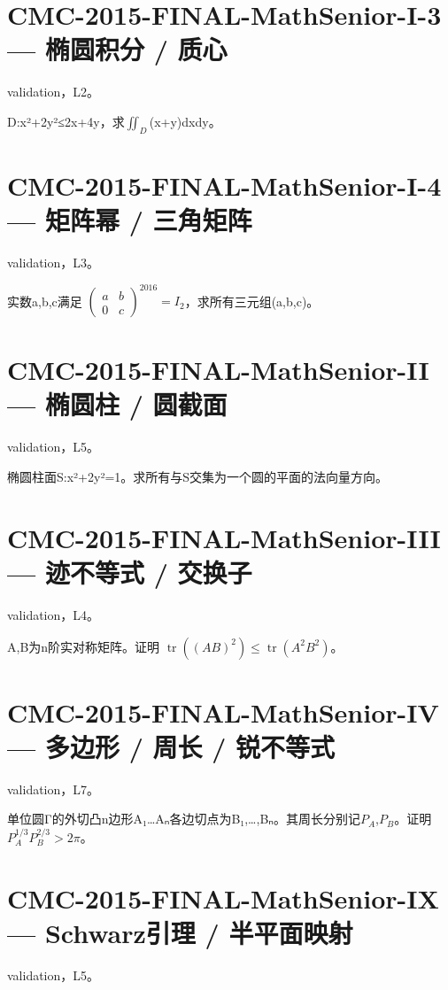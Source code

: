 \documentclass[UTF8]{ctexart}
\begin{document}
\section*{CMC-2015-FINAL-MathSenior-I-3 — 椭圆积分 / 质心}

validation，L2。

D:x²+2y²≤2x+4y，求$∬_D$(x+y)dxdy。

\section*{CMC-2015-FINAL-MathSenior-I-4 — 矩阵幂 / 三角矩阵}

validation，L3。

实数a,b,c满足 $\begin{pmatrix}a&b\\0&c\end{pmatrix}^{2016}=I_2$，求所有三元组(a,b,c)。

\section*{CMC-2015-FINAL-MathSenior-II — 椭圆柱 / 圆截面}

validation，L5。

椭圆柱面S:x²+2y²=1。求所有与S交集为一个圆的平面的法向量方向。

\section*{CMC-2015-FINAL-MathSenior-III — 迹不等式 / 交换子}

validation，L4。

A,B为n阶实对称矩阵。证明 $\operatorname{tr}((AB)^2)\le\operatorname{tr}(A^2B^2)$。

\section*{CMC-2015-FINAL-MathSenior-IV — 多边形 / 周长 / 锐不等式}

validation，L7。

单位圆Γ的外切凸n边形A₁…Aₙ各边切点为B₁,…,Bₙ。其周长分别记$P_A$,$P_B$。证明 $P_A^{1/3}P_B^{2/3}>2\pi$。

\section*{CMC-2015-FINAL-MathSenior-IX — Schwarz引理 / 半平面映射}

validation，L5。
\end{document}
